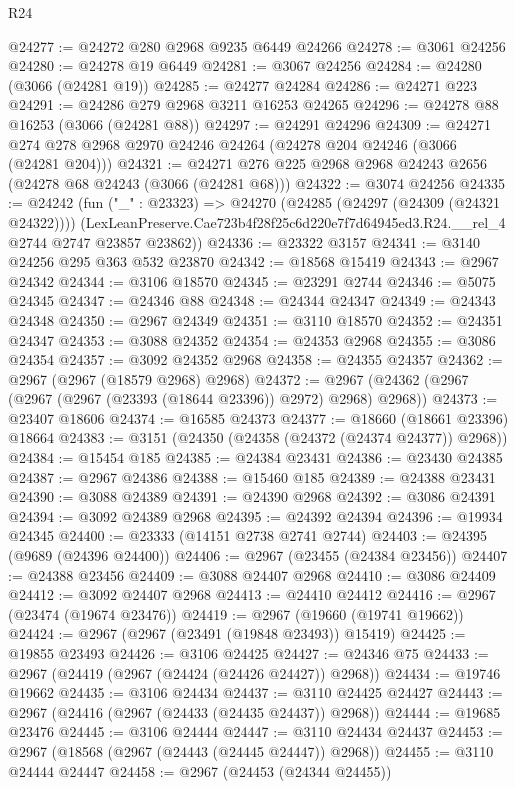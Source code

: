 \begin{lexlean}{R24}
\begin{coremodule}
@24277 := @24272 @280 @2968 @9235 @6449 @24266
@24278 := @3061 @24256
@24280 := @24278 @19 @6449
@24281 := @3067 @24256
@24284 := @24280 (@3066 (@24281 @19))
@24285 := @24277 @24284
@24286 := @24271 @223
@24291 := @24286 @279 @2968 @3211 @16253 @24265
@24296 := @24278 @88 @16253 (@3066 (@24281 @88))
@24297 := @24291 @24296
@24309 := @24271 @274 @278 @2968 @2970 @24246 @24264 (@24278 @204 @24246 (@3066 (@24281 @204)))
@24321 := @24271 @276 @225 @2968 @2968 @24243 @2656 (@24278 @68 @24243 (@3066 (@24281 @68)))
@24322 := @3074 @24256
@24335 := @24242
    (fun ("_" : @23323) =>
    @24270
      (@24285 (@24297 (@24309 (@24321 @24322))))
      (LexLeanPreserve.Cae723b4f28f25c6d220e7f7d64945ed3.R24.__rel_4 @2744 @2747 @23857 @23862))
@24336 := @23322 @3157
@24341 := @3140 @24256 @295 @363 @532 @23870
@24342 := @18568 @15419
@24343 := @2967 @24342
@24344 := @3106 @18570
@24345 := @23291 @2744
@24346 := @5075 @24345
@24347 := @24346 @88
@24348 := @24344 @24347
@24349 := @24343 @24348
@24350 := @2967 @24349
@24351 := @3110 @18570
@24352 := @24351 @24347
@24353 := @3088 @24352
@24354 := @24353 @2968
@24355 := @3086 @24354
@24357 := @3092 @24352 @2968
@24358 := @24355 @24357
@24362 := @2967 (@2967 (@18579 @2968) @2968)
@24372 := @2967 (@24362 (@2967 (@2967 (@2967 (@23393 (@18644 @23396)) @2972) @2968) @2968))
@24373 := @23407 @18606
@24374 := @16585 @24373
@24377 := @18660 (@18661 @23396) @18664
@24383 := @3151 (@24350 (@24358 (@24372 (@24374 @24377)) @2968))
@24384 := @15454 @185
@24385 := @24384 @23431
@24386 := @23430 @24385
@24387 := @2967 @24386
@24388 := @15460 @185
@24389 := @24388 @23431
@24390 := @3088 @24389
@24391 := @24390 @2968
@24392 := @3086 @24391
@24394 := @3092 @24389 @2968
@24395 := @24392 @24394
@24396 := @19934 @24345
@24400 := @23333 (@14151 @2738 @2741 @2744)
@24403 := @24395 (@9689 (@24396 @24400))
@24406 := @2967 (@23455 (@24384 @23456))
@24407 := @24388 @23456
@24409 := @3088 @24407 @2968
@24410 := @3086 @24409
@24412 := @3092 @24407 @2968
@24413 := @24410 @24412
@24416 := @2967 (@23474 (@19674 @23476))
@24419 := @2967 (@19660 (@19741 @19662))
@24424 := @2967 (@2967 (@23491 (@19848 @23493)) @15419)
@24425 := @19855 @23493
@24426 := @3106 @24425
@24427 := @24346 @75
@24433 := @2967 (@24419 (@2967 (@24424 (@24426 @24427)) @2968))
@24434 := @19746 @19662
@24435 := @3106 @24434
@24437 := @3110 @24425 @24427
@24443 := @2967 (@24416 (@2967 (@24433 (@24435 @24437)) @2968))
@24444 := @19685 @23476
@24445 := @3106 @24444
@24447 := @3110 @24434 @24437
@24453 := @2967 (@18568 (@2967 (@24443 (@24445 @24447)) @2968))
@24455 := @3110 @24444 @24447
@24458 := @2967 (@24453 (@24344 @24455))

\end{coremodule}
\end{lexlean}
